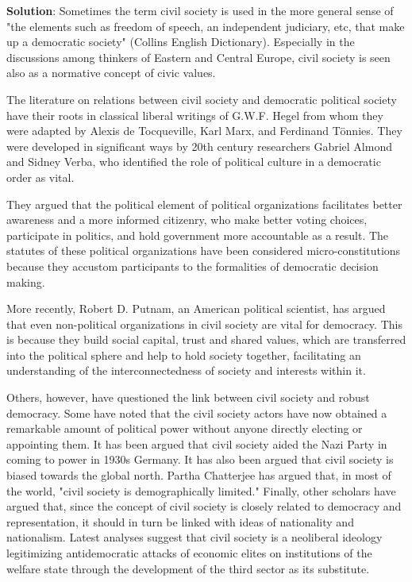 \documentclass[
  openany]{book}
\newenvironment{solution}{ {\bfseries Solution}:}{}
\begin{document}
\begin{questions}
\begin{solution}
Sometimes the term civil society is used in the more general sense of "the elements such as freedom of speech, an independent judiciary, etc, that make up a democratic society" (Collins English Dictionary). Especially in the discussions among thinkers of Eastern and Central Europe, civil society is seen also as a normative concept of civic values.

The literature on relations between civil society and democratic political society have their roots in classical liberal writings of G.W.F. Hegel from whom they were adapted by Alexis de Tocqueville, Karl Marx, and Ferdinand Tönnies. They were developed in significant ways by 20th century researchers Gabriel Almond and Sidney Verba, who identified the role of political culture in a democratic order as vital.

They argued that the political element of political organizations facilitates better awareness and a more informed citizenry, who make better voting choices, participate in politics, and hold government more accountable as a result. The statutes of these political organizations have been considered micro-constitutions because they accustom participants to the formalities of democratic decision making.

More recently, Robert D. Putnam, an American political scientist, has argued that even non-political organizations in civil society are vital for democracy. This is because they build social capital, trust and shared values, which are transferred into the political sphere and help to hold society together, facilitating an understanding of the interconnectedness of society and interests within it.

Others, however, have questioned the link between civil society and robust democracy. Some have noted that the civil society actors have now obtained a remarkable amount of political power without anyone directly electing or appointing them. It has been argued that civil society aided the Nazi Party in coming to power in 1930s Germany. It has also been argued that civil society is biased towards the global north. Partha Chatterjee has argued that, in most of the world, "civil society is demographically limited." Finally, other scholars have argued that, since the concept of civil society is closely related to democracy and representation, it should in turn be linked with ideas of nationality and nationalism. Latest analyses suggest that civil society is a neoliberal ideology legitimizing antidemocratic attacks of economic elites on institutions of the welfare state through the development of the third sector as its substitute.


\end{solution}
\end{questions}
\end{document}
